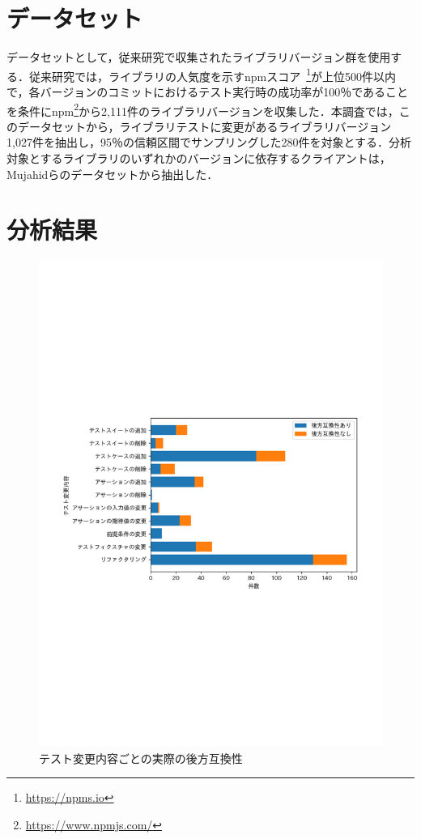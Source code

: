 \documentclass[11pt,dvipdfmx]{jreport}
\begin{document}
\section{データセット}\label{rq1:datasets}
データセットとして，従来研究\cite{matsuda}で収集されたライブラリバージョン群を使用する．従来研究では，ライブラリの人気度を示すnpmスコア~\footnote{\url{https://npms.io}}が上位500件以内で，各バージョンのコミットにおけるテスト実行時の成功率が100％であることを条件にnpm\footnote{\url{https://www.npmjs.com/}}から2,111件のライブラリバージョンを収集した．本調査では，このデータセットから，ライブラリテストに変更があるライブラリバージョン1,027件を抽出し，95％の信頼区間でサンプリングした280件を対象とする．分析対象とするライブラリのいずれかのバージョンに依存するクライアントは，Mujahidらのデータセットから抽出した．

\section{分析結果}
\begin{figure}[t]
  \label{fig:test_pattern}
  \centering
  \includegraphics[width=1.0\linewidth]{fig/barh-test-pattern.pdf}
  \caption{テスト変更内容ごとの実際の後方互換性}
\end{figure}
\end{document}
